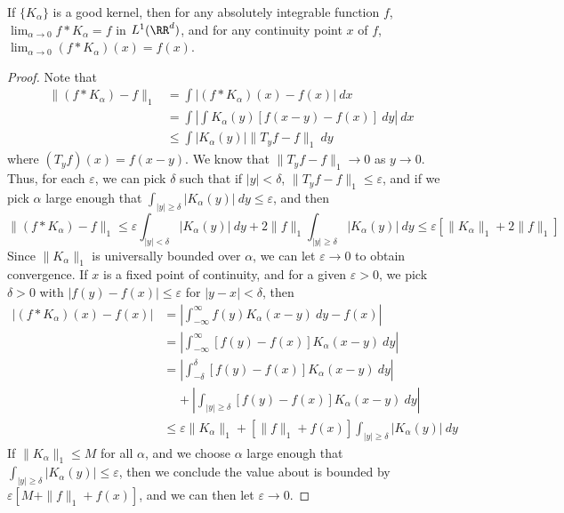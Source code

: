 \begin{theorem}
    If $\{ K_\alpha \}$ is a good kernel, then for any absolutely integrable function $f$, $\lim_{\alpha \to 0} f * K_\alpha = f$ in $L^1(\RR^d)$, and for any continuity point $x$ of $f$, $\lim_{\alpha \to 0} (f * K_\alpha)(x) = f(x)$.
\end{theorem}
\begin{proof}
    Note that
    \begin{align*}
        \| (f * K_\alpha) - f \|_1 &= \int |(f * K_\alpha)(x) - f(x)|\ dx\\
        &= \int \left| \int K_\alpha(y) [f(x - y) - f(x)]\ dy \right|\ dx\\
        &\leq \int |K_\alpha(y)| \| T_y f - f \|_1\ dy
    \end{align*}
    where $(T_y f)(x) = f(x - y)$. We know that $\| T_y f - f \|_1 \to 0$ as $y \to 0$. Thus, for each $\varepsilon$, we can pick $\delta$ such that if $|y| < \delta$, $\| T_y f - f \|_1 \leq \varepsilon$, and if we pick $\alpha$ large enough that $\int_{|y| \geq \delta} |K_\alpha(y)|\ dy \leq \varepsilon$, and then
    \[ \| (f * K_\alpha) - f \|_1 \leq \varepsilon \int_{|y| < \delta} |K_\alpha(y)|\ dy + 2 \| f \|_1 \int_{|y| \geq \delta} |K_\alpha(y)|\ dy \leq \varepsilon[\| K_\alpha \|_1 + 2 \| f \|_1] \]
    Since $\| K_\alpha \|_1$ is universally bounded over $\alpha$, we can let $\varepsilon \to 0$ to obtain convergence. If $x$ is a fixed point of continuity, and for a given $\varepsilon > 0$, we pick $\delta > 0$ with $|f(y) - f(x)| \leq \varepsilon$ for $|y - x| < \delta$, then
    \begin{align*}
        |(f * K_\alpha)(x) - f(x)| &= \left| \int_{-\infty}^\infty f(y) K_\alpha(x - y)\ dy - f(x) \right|\\
        &= \left| \int_{-\infty}^\infty [f(y) - f(x)] K_\alpha(x-y)\ dy \right|\\
        &= \left| \int_{-\delta}^\delta [f(y) - f(x)] K_\alpha(x-y)\ dy \right|\\
        &\ \ \ \ \ + \left| \int_{|y| \geq \delta} [f(y) - f(x)] K_\alpha(x - y)\ dy \right|\\
        &\leq \varepsilon \| K_\alpha \|_1 + [\| f \|_1 + f(x)] \int_{|y| \geq \delta} |K_\alpha(y)|\ dy
    \end{align*}
    If $\| K_\alpha \|_1 \leq M$ for all $\alpha$, and we choose $\alpha$ large enough that $\int_{|y| \geq \delta} |K_\alpha(y)| \leq \varepsilon$, then we conclude the value about is bounded by $\varepsilon [M + \| f \|_1 + f(x)]$, and we can then let $\varepsilon \to 0$.
\end{proof}

